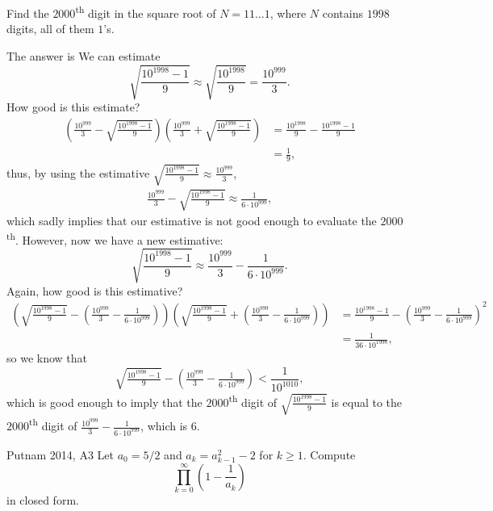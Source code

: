 
\begin{prob}{}{}
	Find the $2000$\textsuperscript{th} digit in the square root of $N = 11\dots1$, where $N$ contains $1998$ digits, all of them $1$'s.
\end{prob}

\begin{sol}{}{}
	The answer is 
	We can estimate \[
		\sqrt{\frac{10^{1998} - 1}{9}} \approx \sqrt{\frac{10^{1998}}{9}} = \frac{10^{999}}{3}.
	\]
	How good is this estimate?
	\begin{align*}
		\left(\frac{10^{999}}{3} - \sqrt{\frac{10^{1998} - 1}{9}}\right)
		\left(\frac{10^{999}}{3} + \sqrt{\frac{10^{1998} - 1}{9}}\right) &=
		\frac{10^{1998}}{9} - \frac{10^{1998}-1}{9} \\
		&= \frac{1}{9},
	\end{align*}
	thus, by using the estimative $\sqrt{\frac{10^{1998} - 1}{9}} \approx \frac{10^{999}}{3}$,
	\begin{align*}
		\frac{10^{999}}{3} - \sqrt{\frac{10^{1998} - 1}{9}} \approx \frac{1}{6 \cdot 10^{999}},
	\end{align*}
	which sadly implies that our estimative is not good enough to evaluate the \(2000\)\textsuperscript{th}. However, now we have a new estimative:
	\[
		\sqrt{\frac{10^{1998} - 1}{9}} \approx \frac{10^{999}}{3} - \frac{1}{6 \cdot 10^{999}}.
	\]
	Again, how good is this estimative?
	\begin{align*}
		\left(\sqrt{\tfrac{10^{1998} - 1}{9}} - \left(\tfrac{10^{999}}{3} - \tfrac{1}{6 \cdot 10^{999}}\right)\right)
		\left(\sqrt{\tfrac{10^{1998} - 1}{9}} + \left(\tfrac{10^{999}}{3} - \tfrac{1}{6 \cdot 10^{999}}\right)\right)
		&= 
		\tfrac{10^{1998} - 1}{9} - \left(\tfrac{10^{999}}{3} - \tfrac{1}{6 \cdot 10^{999}}\right)^2 \\
		&= \tfrac{1}{36 \cdot 10^{1998}},
	\end{align*}
	so we know that \[
		\sqrt{\tfrac{10^{1998} - 1}{9}} - \left(\tfrac{10^{999}}{3} - \tfrac{1}{6 \cdot 10^{999}}\right) < \frac{1}{10^{1010}},
	\]
	which is good enough to imply that the \(2000\)\textsuperscript{th} digit of \(\sqrt{\tfrac{10^{1998} - 1}{9}}\) is equal to the \(2000\)\textsuperscript{th} digit of \(\tfrac{10^{999}}{3} - \tfrac{1}{6 \cdot 10^{999}}\), which is \(6\).
\end{sol}

\begin{prob}{Putnam 2014, A3}{}
	Let $a_0=5/2$ and $a_k=a_{k-1}^2-2$ for $k\ge 1.$ Compute \[\prod_{k=0}^{\infty}\left(1-\frac1{a_k}\right)\] in closed form.
\end{prob}

